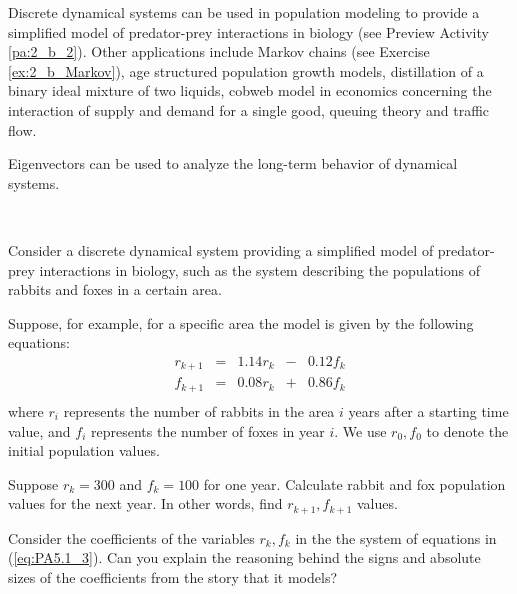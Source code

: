 Discrete dynamical systems can be used in population modeling to provide a simplified model of predator-prey interactions in biology (see Preview Activity \ref{pa:2_b_2}). Other applications include Markov chains (see Exercise \ref{ex:2_b_Markov}), age structured population growth models, distillation of a binary ideal mixture of two liquids, cobweb model in economics concerning the interaction of supply and demand for a single good, queuing theory and traffic flow. 

Eigenvectors can be used to analyze the long-term behavior of dynamical systems.

\begin{pa} \label{pa:2_b_2} ~
\be
\item Consider a discrete dynamical system providing a simplified model of predator-prey interactions in biology, such as the system describing the populations of rabbits and foxes in a certain area. 

Suppose, for example, for a specific area the model is given by the following equations:
\begin{equation}  \label{eq:PA5.1_3}
\begin{alignedat}{4}
r_{k+1}	&{}={} 	&{1.14}r_k 	&{}-{}	&{0.12}f_k \\
f_{k+1}	&{}={} 	&{0.08}r_k 	&{}+{}	&{0.86}f_k \\
\end{alignedat}
\end{equation}
where $r_i$ represents the number of rabbits in the area $i$ years after a starting time value, and $f_i$ represents the number of foxes in year $i$. We use $r_0, f_0$ to denote the initial population values.

\ba
\item Suppose $r_k=300$ and $f_k=100$ for one year. Calculate rabbit and fox population values for the next year. In other words, find $r_{k+1}, f_{k+1}$ values.

\item Consider the coefficients of the variables $r_k, f_k$ in the the system of equations in (\ref{eq:PA5.1_3}). Can you explain the reasoning behind the signs and absolute sizes of the coefficients from the story that it models? 


\end{pa}
